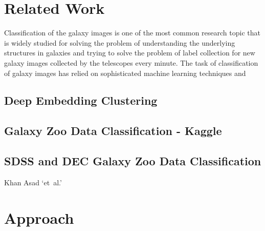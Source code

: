 \documentclass{article}
\begin{document}
\section{Related Work}

Classification of the galaxy images is one of the most common research topic that is widely studied for solving the problem of understanding the underlying structures in galaxies and trying to solve the problem of label collection for new galaxy images collected by the telescopes every minute. The task of classification of galaxy images has relied on sophisticated machine learning techniques and 

\subsection{Deep Embedding Clustering}

\subsection{Galaxy Zoo Data Classification - Kaggle}

\subsection{SDSS and DEC Galaxy Zoo Data Classification}
Khan Asad `et~al.'

















\section{Approach}
\end{document}
